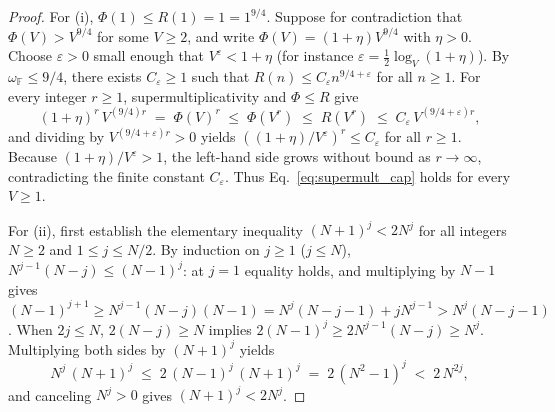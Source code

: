 \documentclass[11pt,a4paper]{article}
\theoremstyle{plain}
\theoremstyle{definition}
\theoremstyle{remark}
\newcommand{\F}{\mathbb{F}}
\begin{document}
\begin{proof}
For (i), $\Phi(1) \le R(1) = 1 = 1^{9/4}$. Suppose for contradiction that $\Phi(V) > V^{9/4}$ for some $V \ge 2$, and write $\Phi(V) = (1 + \eta) V^{9/4}$ with $\eta > 0$. Choose $\varepsilon > 0$ small enough that $V^\varepsilon < 1 + \eta$ (for instance $\varepsilon = \frac{1}{2}\log_V(1 + \eta)$). By $\omega_{\F} \le 9/4$, there exists $C_\varepsilon \ge 1$ such that $R(n) \le C_\varepsilon n^{9/4 + \varepsilon}$ for all $n \ge 1$. For every integer $r \ge 1$, supermultiplicativity and $\Phi \le R$ give
\begin{equation}
    (1 + \eta)^r\,V^{(9/4)r} \;=\; \Phi(V)^r \;\le\; \Phi(V^r) \;\le\; R(V^r) \;\le\; C_\varepsilon\,V^{(9/4 + \varepsilon)r} ,
    \label{eq:supermult_contra}
\end{equation}
and dividing by $V^{(9/4 + \varepsilon)r} > 0$ yields $((1 + \eta)/V^\varepsilon)^r \le C_\varepsilon$ for all $r \ge 1$. Because $(1 + \eta)/V^\varepsilon > 1$, the left-hand side grows without bound as $r \to \infty$, contradicting the finite constant $C_\varepsilon$. Thus Eq.~\eqref{eq:supermult_cap} holds for every $V \ge 1$.

For (ii), first establish the elementary inequality $(N + 1)^j < 2 N^j$ for all integers $N \ge 2$ and $1 \le j \le N/2$. By induction on $j \ge 1$ ($j \le N$), $N^{j-1}(N - j) \le (N - 1)^j$: at $j = 1$ equality holds, and multiplying by $N - 1$ gives $(N - 1)^{j+1} \ge N^{j-1}(N - j)(N - 1) = N^j(N - j - 1) + j N^{j-1} > N^j(N - j - 1)$. When $2j \le N$, $2(N - j) \ge N$ implies $2(N - 1)^j \ge 2 N^{j-1}(N - j) \ge N^j$. Multiplying both sides by $(N + 1)^j$ yields
\begin{equation}
    N^j\,(N + 1)^j \;\le\; 2\,(N - 1)^j\,(N + 1)^j \;=\; 2\,(N^2 - 1)^j \;<\; 2\,N^{2j} ,
    \label{eq:bernoulli_nat}
\end{equation}
and canceling $N^j > 0$ gives $(N + 1)^j < 2 N^j$.


\end{proof}
\end{document}
